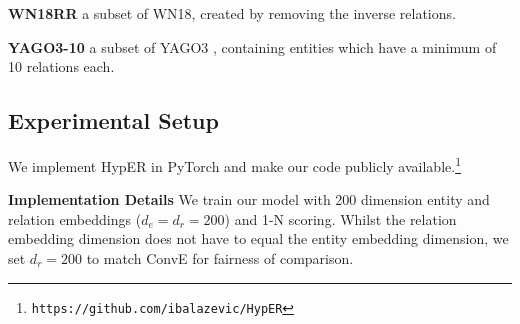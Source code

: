 \documentclass[runningheads]{llncs}
\newcommand{\keypoint}[1]{\vspace{0.1cm}\noindent\textbf{#1}\quad}
\begin{document}
\keypoint{WN18RR} \cite{dettmers2017convolutional} a subset of WN18, created by removing the inverse relations. 

\keypoint{YAGO3-10} \cite{dettmers2017convolutional} a subset of YAGO3 \cite{mahdisoltani2013yago3}, containing entities which have a minimum of 10 relations each. 
\vspace{-0.5cm}
\begin{table}[!htp]
	\centering
	\caption{Summary of dataset statistics.}
     \label{table:datasets}
 \end{table}

\vspace{-1cm}
\subsection{Experimental Setup}

We implement HypER in PyTorch \cite{paszke2017automatic} and make our code publicly available.\footnote{\texttt{https://github.com/ibalazevic/HypER}} 



\keypoint{Implementation Details}
We train our model with 200 dimension entity and relation embeddings ($d_e=d_r=200$) and 1-N scoring. Whilst the relation embedding dimension does not have to equal the entity embedding dimension, we set $d_r=200$ to match ConvE for fairness of comparison.
\end{document}
